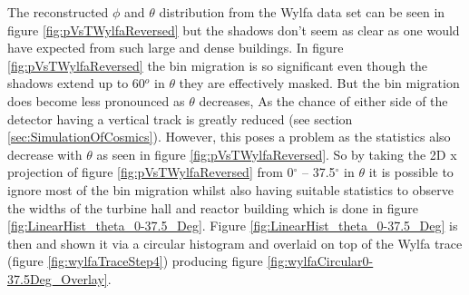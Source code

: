 The reconstructed $\phi$ and $\theta$ distribution from the Wylfa data set can be seen in figure \ref{fig:pVsTWylfaReversed} but the shadows don't seem as clear as one would have expected from such large and dense buildings. In figure \ref{fig:pVsTWylfaReversed} the bin migration is so significant even though the shadows extend up to 60$^o$ in $\theta$ they are effectively masked. But the bin migration does become less pronounced as $\theta$ decreases, As the chance of either side of the detector having a vertical track is greatly reduced (see section \ref{sec:SimulationOfCosmics}). However, this poses a problem as the statistics also decrease with $\theta$ as seen in figure \ref{fig:pVsTWylfaReversed}. So by taking the 2D x projection of figure \ref{fig:pVsTWylfaReversed} from 0$^\circ$ -- 37.5$^\circ$ in $\theta$ it is possible to ignore most of the bin migration whilst also having suitable statistics to observe the widths of the turbine hall and reactor building which is done in figure \ref{fig:LinearHist_theta_0-37.5_Deg}. Figure \ref{fig:LinearHist_theta_0-37.5_Deg} is then and shown it via a circular histogram and overlaid on top of the Wylfa trace (figure \ref{fig:wylfaTraceStep4}) producing figure \ref{fig:wylfaCircular0-37.5Deg_Overlay}. 

